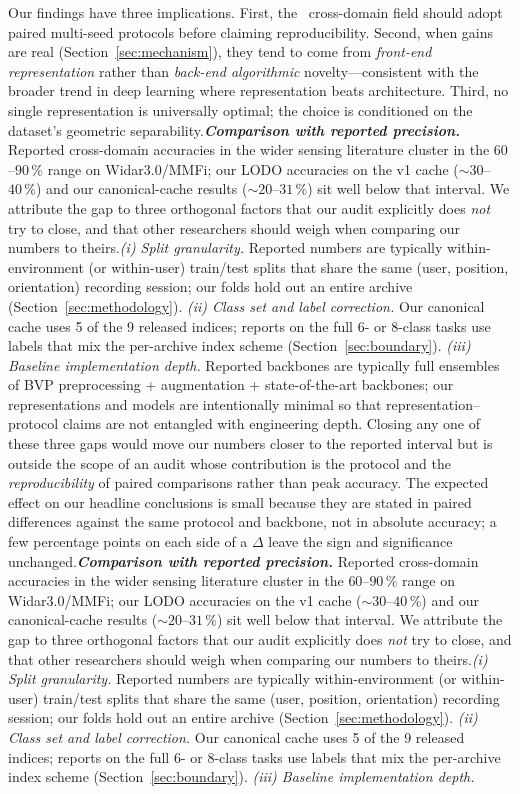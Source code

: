 \documentclass[11pt]{article}
\theoremstyle{definition}
\newcommand{\CSI}{\text{CSI}}
\newcommand{\LODO}{\text{LODO}}
\begin{document}
Our findings have three implications. First, the \CSI\ cross-domain field should adopt paired multi-seed protocols before claiming reproducibility. Second, when gains are real (Section~\ref{sec:mechanism}), they tend to come from \emph{front-end representation} rather than \emph{back-end algorithmic} novelty---consistent with the broader trend in deep learning where representation beats architecture. Third, no single representation is universally optimal; the choice is conditioned on the dataset's geometric separability.\textbf{\emph{Comparison with reported precision.}} Reported cross-domain accuracies in the wider \CSI{} sensing literature cluster in the $60$--$90\,\%$ range on Widar3.0/MMFi; our LODO accuracies on the v1 cache ($\sim 30$--$40\,\%$) and our canonical-cache results ($\sim 20$--$31\,\%$) sit well below that interval. We attribute the gap to three orthogonal factors that our audit explicitly does \emph{not} try to close, and that other researchers should weigh when comparing our numbers to theirs.\emph{(i) Split granularity.} Reported numbers are typically within-environment (or within-user) train/test splits that share the same (user, position, orientation) recording session; our \LODO{} folds hold out an entire archive (Section~\ref{sec:methodology}). \emph{(ii) Class set and label correction.} Our canonical cache uses 5 of the 9 released indices; reports on the full 6- or 8-class tasks use labels that mix the per-archive index scheme (Section~\ref{sec:boundary}). \emph{(iii) Baseline implementation depth.} Reported backbones are typically full ensembles of BVP preprocessing + augmentation + state-of-the-art backbones; our representations and models are intentionally minimal so that representation--protocol claims are not entangled with engineering depth. Closing any one of these three gaps would move our numbers closer to the reported interval but is outside the scope of an audit whose contribution is the protocol and the \emph{reproducibility} of paired comparisons rather than peak accuracy. The expected effect on our headline conclusions is small because they are stated in paired differences against the same protocol and backbone, not in absolute accuracy; a few percentage points on each side of a $\Delta$ leave the sign and significance unchanged.\textbf{\emph{Comparison with reported precision.}} Reported cross-domain accuracies in the wider \CSI{} sensing literature cluster in the $60$--$90\,\%$ range on Widar3.0/MMFi; our LODO accuracies on the v1 cache ($\sim 30$--$40\,\%$) and our canonical-cache results ($\sim 20$--$31\,\%$) sit well below that interval. We attribute the gap to three orthogonal factors that our audit explicitly does \emph{not} try to close, and that other researchers should weigh when comparing our numbers to theirs.\emph{(i) Split granularity.} Reported numbers are typically within-environment (or within-user) train/test splits that share the same (user, position, orientation) recording session; our \LODO{} folds hold out an entire archive (Section~\ref{sec:methodology}). \emph{(ii) Class set and label correction.} Our canonical cache uses 5 of the 9 released indices; reports on the full 6- or 8-class tasks use labels that mix the per-archive index scheme (Section~\ref{sec:boundary}). \emph{(iii) Baseline implementation depth.} 
\end{document}
